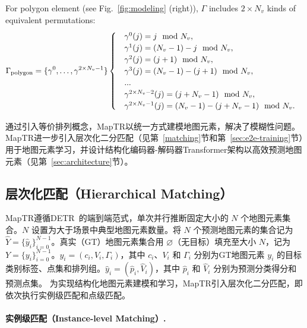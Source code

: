 \documentclass{article} %
\begin{document}
For polygon element (see Fig.~\ref{fig:modeling} (right)),  $\Gamma$ includes $2\times N_v$ kinds of equivalent permutations:
\begin{equation}
\begin{aligned}
&\Gamma_{\rm{polygon}} = \{\gamma^{0}, \dots, \gamma^{2 \times N_v-1}\}
\begin{cases}
&\gamma^{0}(j) = j \mod N_v,\\
&\gamma^{1}(j) = (N_v - 1) - j \mod N_v,\\
&\gamma^{2}(j) = (j + 1) \mod N_v,\\
&\gamma^{3}(j) = (N_v - 1) - (j + 1) \mod N_v,\\
&...\\
&\gamma^{2 \times N_v - 2}(j) = (j + N_v - 1) \mod N_v,\\
&\gamma^{2 \times N_v - 1}(j) = (N_v - 1) - (j + N_v - 1) \mod N_v.
\end{cases}
\end{aligned}
\end{equation}




通过引入等价排列概念，MapTR以统一方式建模地图元素，解决了模糊性问题。
MapTR进一步引入层次化二分匹配（见第~\ref{matching}节和第~\ref{sec:e2e-training}节）用于地图元素学习，并设计结构化编码器-解码器Transformer架构以高效预测地图元素（见第~\ref{sec:architecture}节）。

\subsection{层次化匹配（Hierarchical Matching）\label{matching}}
MapTR遵循DETR~\citep{detr,yolos}的端到端范式，单次并行推断固定大小的 $N$ 个地图元素集合。$N$ 设置为大于场景中典型地图元素数量。将 $N$ 个预测地图元素的集合记为 $\hat{Y} = \{\hat{y}_i \}_{i=0}^{N-1}$。真实（GT）地图元素集合用 $\varnothing$（无目标）填充至大小 $N$，记为 $Y=\{y_i\}_{i=0}^{N-1}$。$y_i=(c_i, V_i, \Gamma_i)$，其中 $c_i$、$V_i$ 和 $\Gamma_i$ 分别为GT地图元素 $y_i$ 的目标类别标签、点集和排列组。$\hat{y}_i=(\hat{p}_i, \hat{V}_i)$，其中 $\hat{p}_i$ 和 $\hat{V}_i$ 分别为预测分类得分和预测点集。
为实现结构化地图元素建模和学习，MapTR引入层次化二分匹配，即依次执行实例级匹配和点级匹配。


\paragraph{实例级匹配（Instance-level Matching）.\label{sec:ins-lvl-matching}}
\end{document}
